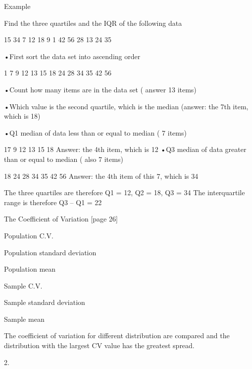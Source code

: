 \documentclass[]{report}
\begin{document}
Example

Find the three quartiles and the IQR of the following data

 15  34  7  12  18  9  1  42  56  28  13  24  35

•First sort the data set into ascending order

1 7  9 12 13 15 18  24 28 34 35 42 56

•Count how many items are in the data set ( answer 13 items)

•Which value is the second quartile, which is the median (answer: the 7th item, which is 18)

•Q1  median of data less than or equal to median ( 7 items)

17  9 12 13 15 18 
 Answer: the 4th item, which is 12
•Q3  median of data greater than or equal to median ( also 7 items)

18  24 28 34 35 42 56 
Answer: the 4th item of this 7, which is 34

The three quartiles are therefore Q1 = 12, Q2 = 18, Q3 = 34
The interquartile range is therefore Q3 – Q1 = 22

 


The Coefficient of Variation [page 26]

Population C.V.
 
 

   Population standard deviation

  Population mean


Sample C.V.

 

     Sample standard deviation 

    Sample mean
 


 
The coefficient of variation for different distribution are compared and the distribution with the largest CV value has the greatest spread.
 




2. 
\end{document}
